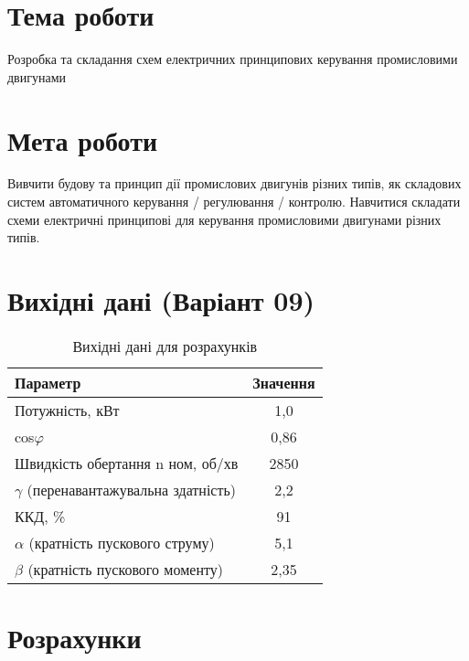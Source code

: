 \documentclass[a4paper]{article}
\begin{document}

    \section*{Тема роботи}
    Розробка та складання схем електричних принципових керування
    промисловими двигунами

    \section*{Мета роботи}
    Вивчити будову та принцип дії промислових двигунів
    різних типів, як складових систем автоматичного
    керування / регулювання / контролю. Навчитися складати схеми електричні
    принципові для керування промисловими двигунами різних типів.

    \section*{Вихідні дані (Варіант 09)}
    \begin{table}[h!]
        \centering
        \begin{tabular}{|l|c|}
            \hline
            \textbf{Параметр} & \textbf{Значення} \\
            \hline
            Потужність, кВт & 1,0 \\
            \hline
            cos$\varphi$ & 0,86 \\
            \hline
            Швидкість обертання n ном, об/хв & 2850 \\
            \hline
            $\gamma$ (перенавантажувальна здатність) & 2,2 \\
            \hline
            ККД, \% & 91 \\
            \hline
            $\alpha$ (кратність пускового струму) & 5,1 \\
            \hline
            $\beta$ (кратність пускового моменту) & 2,35 \\
            \hline
        \end{tabular}
        \caption{Вихідні дані для розрахунків}
    \end{table}

    \section*{Розрахунки}
\end{document}
